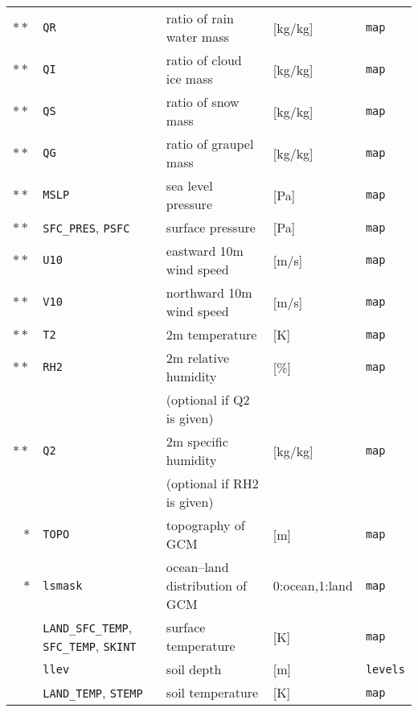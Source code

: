 {\begin{table}[bth]
\begin{center}
\begin{tabularx}{150mm}{rl|l|l|X}
$\ast\ast$ &\verb|QR|      & ratio of rain water mass         & [kg/kg]        & \verb|map|         \\
$\ast\ast$ &\verb|QI|      & ratio of cloud ice mass          & [kg/kg]        & \verb|map|         \\
$\ast\ast$ &\verb|QS|      & ratio of snow mass               & [kg/kg]        & \verb|map|         \\
$\ast\ast$ &\verb|QG|      & ratio of graupel mass            & [kg/kg]        & \verb|map|         \\
$\ast\ast$ &\verb|MSLP|    & sea level pressure               & [Pa]           & \verb|map|         \\
$\ast\ast$ &\verb|SFC_PRES|, \verb|PSFC| & surface pressure                 & [Pa]           & \verb|map|         \\
$\ast\ast$ &\verb|U10|     & eastward 10m wind speed          & [m/s]          & \verb|map|         \\
$\ast\ast$ &\verb|V10|     & northward 10m wind speed         & [m/s]          & \verb|map|         \\
$\ast\ast$ &\verb|T2|      & 2m temperature                   & [K]            & \verb|map|         \\
$\ast\ast$ &\verb|RH2|     & 2m relative humidity             & [\%]           & \verb|map|         \\
           &               & (optional if Q2 is given)        &                &                    \\
$\ast\ast$ &\verb|Q2|      & 2m specific humidity             & [kg/kg]        & \verb|map|         \\
           &               & (optional if RH2 is given)       &                &                    \\
    $\ast$ &\verb|TOPO|    & topography of GCM                & [m]            & \verb|map|         \\
    $\ast$ &\verb|lsmask|  & ocean--land distribution of GCM  & 0:ocean,1:land & \verb|map|         \\
           &\verb|LAND_SFC_TEMP|, \verb|SFC_TEMP|, \verb|SKINT|   & surface temperature              & [K]            & \verb|map|         \\
           &\verb|llev|    & soil depth                       & [m]            & \verb|levels|      \\
           &\verb|LAND_TEMP|, \verb|STEMP| & soil temperature                 & [K]            & \verb|map|         \\

\end{tabularx}
\end{center}
\end{table}}
